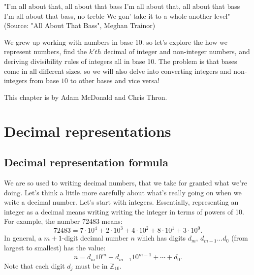 "I'm all about that, all about that bass
I'm all about that, all about that bass
I'm all about that bass, no treble
We gon' take it to a whole another level"
(Source: "All About That Bass", Meghan Trainor)

We grew up working with numbers in base $10$. so let's explore the how we represent numbers, find the $k'th$ decimal of integer and non-integer numbers,  and deriving divisibility rules of integers all in base 10. The problem is that bases come in all different sizes, so we will also delve into converting integers and non-integers from base $10$ to other bases and vice versa!  

This chapter is by Adam McDonald and Chris Thron.

\section{Decimal representations}\label{sec:decimalReps}
\subsection{Decimal representation formula}
We are so used to writing decimal numbers, that we take for granted what we're doing.  Let's think a little more carefully about what's really going on when we write a decimal number. Let's start with integers. 
Essentially, representing an integer as a decimal   means writing writing the integer in terms of powers of 10.  For example, the number 72483 means:
\begin{equation}
72483=7\cdot 10^{4}+2 \cdot 10^{3}+ 4 \cdot 10^2 + 8 \cdot 10^1 + 3 \cdot 10^0.
\end{equation}
In general, a $m+1$-digit decimal number $n$ which has digits $d_m$, $d_{m-1} \ldots d_0$ (from largest to smallest) has the value:
\begin{equation}
n=d_{m}10^{m}+d_{m-1}10^{m-1}+\cdots+d_{0}. 
\end{equation} 
Note that each digit $d_j$ must be in $\mathbb{Z}_{10}$.

